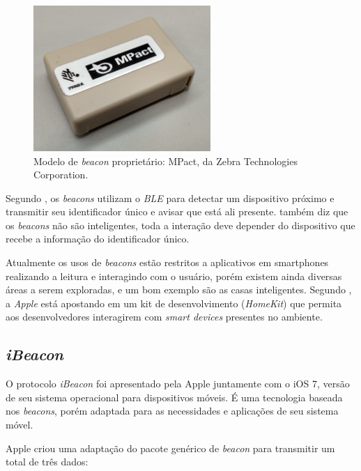 \documentclass[
		12pt,				%
		openright,			%
		oneside,			%
		a4paper,			%
		chapter=TITLE,		%
		english,			%
		brazil				%
	]{abntex2}
\begin{document}
\begin{figure}[htb]
	\caption{\label{fig:beacon-mpact}Modelo de \textit{beacon} proprietário: MPact, da Zebra Technologies Corporation.}
	\begin{center}
		\includegraphics[width=0.6\textwidth]{img/beacon-mpact.jpg}
	\end{center}
\end{figure}

Segundo , os \textit{beacons} utilizam o \textit{BLE} para detectar um dispositivo próximo e transmitir seu identificador único e avisar que está ali presente.  também diz que os \textit{beacons} não são inteligentes, toda a interação deve depender do dispositivo que recebe a informação do identificador único.

Atualmente os usos de \textit{beacons} estão restritos a aplicativos em smartphones realizando a leitura e interagindo com o usuário, porém existem ainda diversas áreas a serem exploradas, e um bom exemplo são as casas inteligentes. Segundo , a \textit{Apple} está apostando em um kit de desenvolvimento (\textit{HomeKit}) que permita aos desenvolvedores interagirem com \textit{smart devices} presentes no ambiente.

\subsection{\textit{iBeacon}}

O protocolo \textit{iBeacon} foi apresentado pela Apple juntamente com o iOS 7, versão de seu sistema operacional para dispositivos móveis. É uma tecnologia baseada nos \textit{beacons}, porém adaptada para as necessidades e aplicações de seu sistema móvel.

Apple criou uma adaptação do pacote genérico de \textit{beacon} para transmitir um total de três dados:
\end{document}
